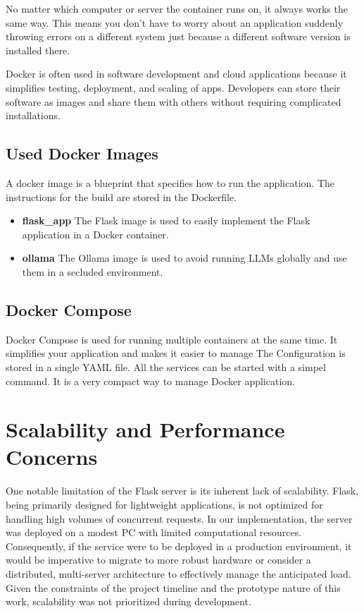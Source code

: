 No matter which computer or server the container runs on, it always works the same way. This means you don’t have to worry about an application suddenly throwing errors on a different system just because a different software version is installed there.

Docker is often used in software development and cloud applications because it simplifies testing, deployment, and scaling of apps. Developers can store their software as images and share them with others without requiring complicated installations.

\subsection{Used Docker Images}
A docker image is a blueprint that specifies how to run the application. The instructions for the build are stored in the Dockerfile.
\cite{dockerize_flask} 

\begin{itemize}
    \item \textbf{flask\_app} The Flask image is used to easily implement the Flask application in a Docker container.
    \item \textbf{ollama} The Ollama image is used to avoid running LLMs globally and use them in a secluded environment.
\end{itemize}

\subsection{Docker Compose}
Docker Compose is used for running multiple containers at the same time. It simplifies your application and makes it easier to manage 
The Configuration is stored in a single YAML file. All the services can be started with a simpel command. It is a very compact way to manage Docker application.
\cite{docker_compose} 

\author{Florian Prandstetter}

\section{Scalability and Performance Concerns}

One notable limitation of the Flask server is its inherent lack of scalability. Flask, being primarily designed for lightweight applications, is not optimized for handling high volumes of concurrent requests. In our implementation, the server was deployed on a modest PC with limited computational resources. Consequently, if the service were to be deployed in a production environment, it would be imperative to migrate to more robust hardware or consider a distributed, multi-server architecture to effectively manage the anticipated load. Given the constraints of the project timeline and the prototype nature of this work, scalability was not prioritized during development.


